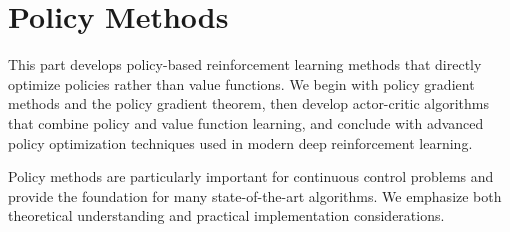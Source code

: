 \part{Policy Methods}

This part develops policy-based reinforcement learning methods that directly optimize policies rather than value functions. We begin with policy gradient methods and the policy gradient theorem, then develop actor-critic algorithms that combine policy and value function learning, and conclude with advanced policy optimization techniques used in modern deep reinforcement learning.

Policy methods are particularly important for continuous control problems and provide the foundation for many state-of-the-art algorithms. We emphasize both theoretical understanding and practical implementation considerations.



